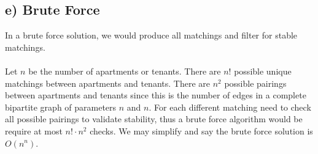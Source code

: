 \documentclass{article}
\begin{document}
\subsection*{e) Brute Force}
In a brute force solution, we would produce all matchings and filter for
stable matchings.
\\\\
Let $n$ be the number of apartments or tenants. There are
$n!$ possible unique matchings between apartments and tenants. There are $n^2$
possible pairings between apartments and tenants since this is the number of
edges in a complete bipartite graph of parameters $n$ and $n$. For each
different matching need to check all possible pairings to validate stability,
thus a brute force algorithm would be require at most $n! \cdot n^2$ checks.
We may simplify and say the brute force solution is $O(n^n)$.
\end{document}
